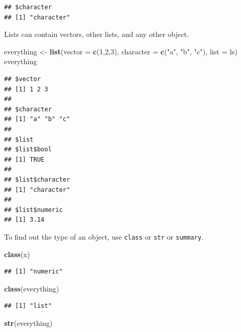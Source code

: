 \documentclass[openany]{book}
\newenvironment{Shaded}{\begin{snugshade}}{\end{snugshade}}
\newcommand{\DataTypeTok}[1]{\textcolor[rgb]{0.13,0.29,0.53}{#1}}
\newcommand{\DecValTok}[1]{\textcolor[rgb]{0.00,0.00,0.81}{#1}}
\newcommand{\KeywordTok}[1]{\textcolor[rgb]{0.13,0.29,0.53}{\textbf{#1}}}
\newcommand{\NormalTok}[1]{#1}
\newcommand{\StringTok}[1]{\textcolor[rgb]{0.31,0.60,0.02}{#1}}
\begin{document}
\begin{verbatim}
## $character
## [1] "character"
\end{verbatim}

Lists can contain vectors, other lists, and any other object.

\begin{Shaded}
\begin{Highlighting}[]
\NormalTok{everything <-}\StringTok{ }\KeywordTok{list}\NormalTok{(}\DataTypeTok{vector =} \KeywordTok{c}\NormalTok{(}\DecValTok{1}\NormalTok{,}\DecValTok{2}\NormalTok{,}\DecValTok{3}\NormalTok{), }
                   \DataTypeTok{character =} \KeywordTok{c}\NormalTok{(}\StringTok{"a"}\NormalTok{, }\StringTok{"b"}\NormalTok{, }\StringTok{"c"}\NormalTok{), }
                   \DataTypeTok{list =}\NormalTok{ ls)}
\NormalTok{everything}
\end{Highlighting}
\end{Shaded}

\begin{verbatim}
## $vector
## [1] 1 2 3
## 
## $character
## [1] "a" "b" "c"
## 
## $list
## $list$bool
## [1] TRUE
## 
## $list$character
## [1] "character"
## 
## $list$numeric
## [1] 3.14
\end{verbatim}

To find out the type of an object, use \texttt{class} or \texttt{str} or \texttt{summary}.

\begin{Shaded}
\begin{Highlighting}[]
\KeywordTok{class}\NormalTok{(x)}
\end{Highlighting}
\end{Shaded}

\begin{verbatim}
## [1] "numeric"
\end{verbatim}

\begin{Shaded}
\begin{Highlighting}[]
\KeywordTok{class}\NormalTok{(everything)}
\end{Highlighting}
\end{Shaded}

\begin{verbatim}
## [1] "list"
\end{verbatim}

\begin{Shaded}
\begin{Highlighting}[]
\KeywordTok{str}\NormalTok{(everything)}
\end{Highlighting}
\end{Shaded}
\end{document}
